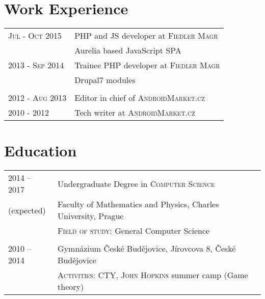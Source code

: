 \documentclass[a4paper,10pt]{article}
\newcommand{\rightcol}{11.2cm}
\newcommand{\leftcol}{2.8cm}
\begin{document}
\section{Work Experience}
\begin{tabular}{p{\leftcol}|p{\rightcol}}
\textsc{Jul - Oct 2015} & PHP and JS developer at \textsc{Fiedler Magr}\\
                    & \footnotesize{Aurelia based JavaScript SPA}\\
\textsc{2013 - Sep 2014} & Trainee PHP developer at \textsc{Fiedler Magr}\\
                    & \footnotesize{Drupal7 modules}\\

\multicolumn{2}{c}{} \\                    
                    
\textsc{2012 - Aug 2013} & Editor in chief of \textsc{AndroidMarket.cz}\\
\textsc{2010 - 2012} & Tech writer at \textsc{AndroidMarket.cz}\\
\end{tabular}

\section{Education}
\begin{tabular}{p{\leftcol}|p{\rightcol}}
2014 -- 2017 & Undergraduate Degree in \textsc{Computer Science}\\
{\footnotesize (expected)} &\normalsize{Faculty of Mathematics and Physics}, {Charles University}, Prague\\
                & \footnotesize{\textsc{Field of study:} {General Computer Science}}\\
\multicolumn{2}{c}{}\\
2010 -- 2014 & {Gymnázium České Budějovice}, Jírovcova 8, České Budějovice\\
                & \footnotesize{\textsc{Activities:} \textsc{CTY, John Hopkins} summer camp (Game theory)}\\
                
\end{tabular}

\end{document}
